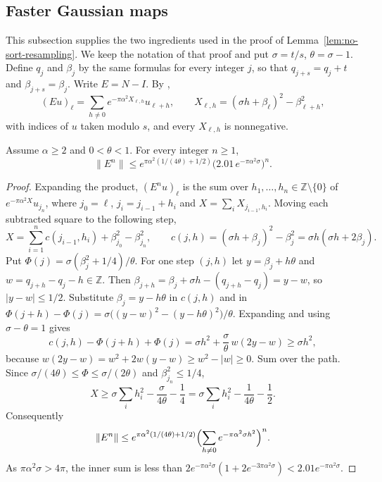 \subsection{Faster Gaussian maps}
\label{sec:fast-gaussian}

This subsection supplies the two ingredients used in the proof of
Lemma~\ref{lem:no-sort-resampling}. We keep the notation of that proof and
put $\sigma=t/s$, $\theta=\sigma-1$. Define $q_j$ and $\beta_j$ by the
same formulas for every integer $j$, so that $q_{j+s}=q_j+t$ and
$\beta_{j+s}=\beta_j$. Write $E=N-I$. By \cite[Section~4.2]{HarveyHoeven2021},
\[
 (Eu)_\ell=\sum_{h\ne0}e^{-\pi\alpha^2X_{\ell,h}}u_{\ell+h},\qquad
 X_{\ell,h}=(\sigma h+\beta_\ell)^2-\beta_{\ell+h}^2,
\]
with indices of $u$ taken modulo $s$, and every $X_{\ell,h}$ is
nonnegative.

\begin{lemma}
\label{lem:correction-powers}
Assume $\alpha\geq2$ and $0<\theta<1$. For every integer $n\geq1$,
\[
 \|E^n\|\leq e^{\pi\alpha^2(1/(4\theta)+1/2)}
   \bigl(2.01\,e^{-\pi\alpha^2\sigma}\bigr)^n.
\]
\end{lemma}

\begin{proof}
Expanding the product, $(E^nu)_\ell$ is the sum over
$h_1,\ldots,h_n\in\mathbb Z\setminus\{0\}$ of $e^{-\pi\alpha^2X}u_{j_n}$,
where $j_0=\ell$, $j_i=j_{i-1}+h_i$ and $X=\sum_iX_{j_{i-1},h_i}$.
Moving each subtracted square to the following step,
\[
 X=\sum_{i=1}^nc(j_{i-1},h_i)+\beta_{j_0}^2-\beta_{j_n}^2,\qquad
 c(j,h)=(\sigma h+\beta_j)^2-\beta_j^2=\sigma h(\sigma h+2\beta_j).
\]
Put $\Phi(j)=\sigma(\beta_j^2+1/4)/\theta$. For one step $(j,h)$ let
$y=\beta_j+h\theta$ and $w=q_{j+h}-q_j-h\in\mathbb Z$. Then
$\beta_{j+h}=\beta_j+\sigma h-(q_{j+h}-q_j)=y-w$, so $|y-w|\leq1/2$.
Substitute $\beta_j=y-h\theta$ in $c(j,h)$ and in
$\Phi(j+h)-\Phi(j)=\sigma\bigl((y-w)^2-(y-h\theta)^2\bigr)/\theta$.
Expanding and using $\sigma-\theta=1$ gives
\[
 c(j,h)-\Phi(j+h)+\Phi(j)=\sigma h^2+\frac\sigma\theta\,w(2y-w)
 \geq\sigma h^2,
\]
because $w(2y-w)=w^2+2w(y-w)\geq w^2-|w|\geq0$. Sum over the path.
Since $\sigma/(4\theta)\leq\Phi\leq\sigma/(2\theta)$ and
$\beta_{j_n}^2\leq1/4$,
\[
 X\geq\sigma\sum_ih_i^2-\frac\sigma{4\theta}-\frac14
  =\sigma\sum_ih_i^2-\frac1{4\theta}-\frac12.
\]
Consequently
\[
 \|E^n\|\leq e^{\pi\alpha^2(1/(4\theta)+1/2)}
  \Bigl(\sum_{h\ne0}e^{-\pi\alpha^2\sigma h^2}\Bigr)^n .
\]
As $\pi\alpha^2\sigma>4\pi$, the inner sum is less than
$2e^{-\pi\alpha^2\sigma}(1+2e^{-3\pi\alpha^2\sigma})<2.01e^{-\pi\alpha^2\sigma}$.
\end{proof}


